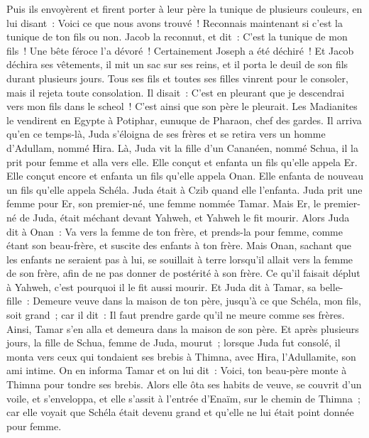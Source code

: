 \begin{multicols}{2}
Puis ils envoyèrent et firent porter à leur père la tunique de plusieurs couleurs, en lui disant~: Voici ce que nous avons trouvé~! Reconnais maintenant si c'est la tunique de ton fils ou non.
Jacob la reconnut, et dit~: C'est la tunique de mon fils~! Une bête féroce l'a dévoré~! Certainement Joseph a été déchiré~!
Et Jacob déchira ses vêtements, il mit un sac sur ses reins, et il porta le deuil de son fils durant plusieurs jours.
Tous ses fils et toutes ses filles vinrent pour le consoler, mais il rejeta toute consolation. Il disait~: C'est en pleurant que je descendrai vers mon fils dans le scheol~! C'est ainsi que son père le pleurait.
Les Madianites le vendirent en Egypte à Potiphar, eunuque de Pharaon, chef des gardes.
\VerseOne{}Il arriva qu'en ce temps-là, Juda s'éloigna de ses frères et se retira vers un homme d'Adullam, nommé Hira.
Là, Juda vit la fille d'un Cananéen, nommé Schua, il la prit pour femme et alla vers elle.
Elle conçut et enfanta un fils qu'elle appela Er.
Elle conçut encore et enfanta un fils qu'elle appela Onan.
Elle enfanta de nouveau un fils qu'elle appela Schéla. Juda était à Czib quand elle l'enfanta.
Juda prit une femme pour Er, son premier-né, une femme nommée Tamar.
Mais Er, le premier-né de Juda, était méchant devant Yahweh, et Yahweh le fit mourir.
Alors Juda dit à Onan~: Va vers la femme de ton frère, et prends-la pour femme, comme étant son beau-frère, et suscite des enfants à ton frère.
Mais Onan, sachant que les enfants ne seraient pas à lui, se souillait à terre lorsqu'il allait vers la femme de son frère, afin de ne pas donner de postérité à son frère.
Ce qu'il faisait déplut à Yahweh, c'est pourquoi il le fit aussi mourir.
Et Juda dit à Tamar, sa belle-fille~: Demeure veuve dans la maison de ton père, jusqu'à ce que Schéla, mon fils, soit grand~; car il dit~: Il faut prendre garde qu'il ne meure comme ses frères. Ainsi, Tamar s'en alla et demeura dans la maison de son père.
Et après plusieurs jours, la fille de Schua, femme de Juda, mourut~; lorsque Juda fut consolé, il monta vers ceux qui tondaient ses brebis à Thimna, avec Hira, l'Adullamite, son ami intime.
On en informa Tamar et on lui dit~: Voici, ton beau-père monte à Thimna pour tondre ses brebis.
Alors elle ôta ses habits de veuve, se couvrit d'un voile, et s'enveloppa, et elle s'assit à l'entrée d'Enaïm, sur le chemin de Thimna~; car elle voyait que Schéla était devenu grand et qu'elle ne lui était point donnée pour femme.

\end{multicols}
